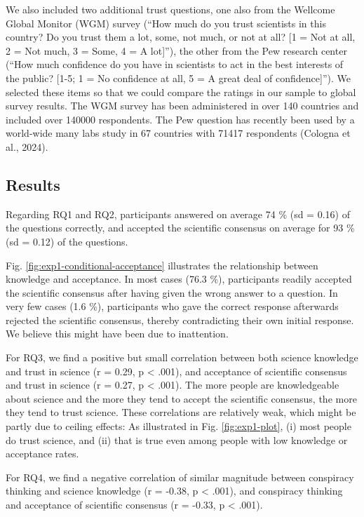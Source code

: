 \documentclass[
  doc,floatsintext]{apa6}
\begin{document}
We also included two additional trust questions, one also from the Wellcome Global Monitor (WGM) survey (``How much do you trust scientists in this country? Do you trust them a lot, some, not much, or not at all? {[}1 = Not at all, 2 = Not much, 3 = Some, 4 = A lot{]}''), the other from the Pew research center (``How much confidence do you have in scientists to act in the best interests of the public? {[}1-5; 1 = No confidence at all, 5 = A great deal of confidence{]}''). We selected these items so that we could compare the ratings in our sample to global survey results. The WGM survey has been administered in over 140 countries and included over 140000 respondents. The Pew question has recently been used by a world-wide many labs study in 67 countries with 71417 respondents (Cologna et al., 2024).

\subsection{Results}\label{results}

Regarding RQ1 and RQ2, participants answered on average 74 \% (sd = 0.16) of the questions correctly, and accepted the scientific consensus on average for 93 \% (sd = 0.12) of the questions.

Fig. \ref{fig:exp1-conditional-acceptance} illustrates the relationship between knowledge and acceptance. In most cases (76.3 \%), participants readily accepted the scientific consensus after having given the wrong answer to a question. In very few cases (1.6 \%), participants who gave the correct response afterwards rejected the scientific consensus, thereby contradicting their own initial response. We believe this might have been due to inattention.

For RQ3, we find a positive but small correlation between both science knowledge and trust in science (r = 0.29, p \textless{} .001), and acceptance of scientific consensus and trust in science (r = 0.27, p \textless{} .001). The more people are knowledgeable about science and the more they tend to accept the scientific consensus, the more they tend to trust science. These correlations are relatively weak, which might be partly due to ceiling effects: As illustrated in Fig. \ref{fig:exp1-plot}, (i) most people do trust science, and (ii) that is true even among people with low knowledge or acceptance rates.

For RQ4, we find a negative correlation of similar magnitude between conspiracy thinking and science knowledge (r = -0.38, p \textless{} .001), and conspiracy thinking and acceptance of scientific consensus (r = -0.33, p \textless{} .001).
\end{document}
